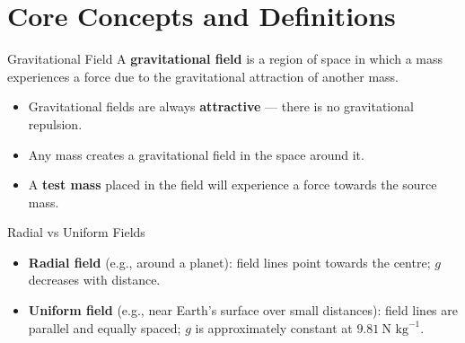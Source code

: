 

\ifstandalone
  \tableofcontents
  \newpage
\fi

\section{Core Concepts and Definitions}

\begin{definitionbox}{Gravitational Field}
A \textbf{gravitational field} is a region of space in which a mass experiences a force due to the gravitational attraction of another mass.
\begin{itemize}[itemsep=2pt]
  \item Gravitational fields are always \textbf{attractive} — there is no gravitational repulsion.
  \item Any mass creates a gravitational field in the space around it.
  \item A \textbf{test mass} placed in the field will experience a force towards the source mass.
\end{itemize}
\end{definitionbox}

\begin{definitionbox}{Radial vs Uniform Fields}
\begin{itemize}[itemsep=2pt]
  \item \textbf{Radial field} (e.g., around a planet): field lines point towards the centre; $g$ decreases with distance.
  \item \textbf{Uniform field} (e.g., near Earth's surface over small distances): field lines are parallel and equally spaced; $g$ is approximately constant at $9.81\ \text{N kg}^{-1}$.
\end{itemize}
\end{definitionbox}

